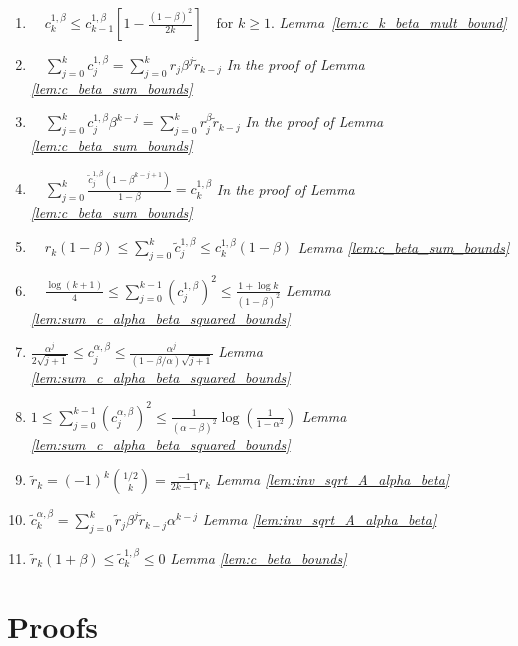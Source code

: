 \documentclass{article} %
\begin{document}
\begin{enumerate}
    \item $\displaystyle \quad c_k^{1,\beta} \le c_{k-1}^{1,\beta} \left[ 1 - \frac{(1 - \beta)^2}{2k} \right] \quad \text{for } k \ge 1.$ \hfill \textit{ Lemma~\ref{lem:c_k_beta_mult_bound}}
    \item $\displaystyle \quad \sum_{j=0}^{k} c_j^{1,\beta} = \sum_{j=0}^{k} r_j \beta^j \tilde{r}_{k-j}$ \hfill \textit{In the proof of Lemma \ref{lem:c_beta_sum_bounds}}
    \item $\displaystyle \quad \sum_{j=0}^{k} c_j^{1,\beta} \beta^{k-j} = \sum_{j=0}^{k} r_j^\beta \tilde{r}_{k-j}$ \hfill \textit{In the proof of Lemma \ref{lem:c_beta_sum_bounds}}
    \item $\displaystyle \quad \sum_{j=0}^{k} \frac{\tilde{c}_j^{1,\beta}(1 - \beta^{k-j+1})}{1 - \beta} = c_k^{1,\beta}$ \hfill \textit{In the proof of Lemma \ref{lem:c_beta_sum_bounds}}
    \item $\displaystyle \quad r_k (1 - \beta) \le \sum_{j=0}^{k} \tilde{c}_j^{1,\beta} \le c_k^{1,\beta} (1 - \beta)$ \hfill \textit{Lemma \ref{lem:c_beta_sum_bounds}}
    \item $\displaystyle \quad \frac{\log(k + 1)}{4} \le \sum_{j=0}^{k-1} (c_{j}^{1, \beta})^2 \le \frac{1 + \log k}{(1 - \beta)^2}$ \hfill \textit{Lemma \ref{lem:sum_c_alpha_beta_squared_bounds}}
    \item $\displaystyle \frac{\alpha^j}{2\sqrt{j + 1}} \le c^{\alpha, \beta}_j \le \frac{\alpha^j}{(1 - \beta/\alpha)\sqrt{j + 1}}$ \hfill \textit{Lemma \ref{lem:sum_c_alpha_beta_squared_bounds}}
    \item $\displaystyle 1 \le \sum_{j=0}^{k-1} (c^{\alpha, \beta}_j)^2 \le \frac{1}{(\alpha - \beta)^2} \log \left( \frac{1}{1 - \alpha^2} \right)$ \hfill \textit{Lemma \ref{lem:sum_c_alpha_beta_squared_bounds}}
    \item $\displaystyle \tilde{r}_k = (-1)^k \binom{1/2}{k} = \frac{-1}{2k-1} r_k $ \hfill \textit{Lemma \ref{lem:inv_sqrt_A_alpha_beta}}
    
    \item $\displaystyle \tilde{c}_k^{\alpha,\beta} = \sum_{j=0}^{k} \tilde{r}_j \beta^j \tilde{r}_{k-j} \alpha^{k-j}$ \hfill \textit{Lemma \ref{lem:inv_sqrt_A_alpha_beta}}
    
    \item $\displaystyle \tilde{r}_k (1 + \beta) \le \tilde{c}_k^{1,\beta} \le 0$ \hfill \textit{Lemma \ref{lem:c_beta_bounds}}
    
   
\end{enumerate}
\clearpage
\section{Proofs}
\label{sub:proofs}
\end{document}
